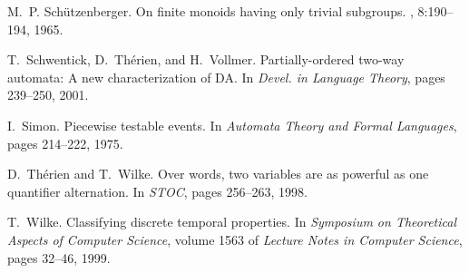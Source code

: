 \documentclass{LMCS}
\begin{document}
\begin{thebibliography}{10}
M.~P. Sch\"utzenberger.
\newblock On finite monoids having only trivial subgroups.
, 8:190--194, 1965.

T.~Schwentick, D.~Th\'erien, and H.~Vollmer.
\newblock Partially-ordered two-way automata: A new characterization of DA.
\newblock In {\em Devel. in Language Theory}, pages 239--250, 2001.

I.~Simon.
\newblock Piecewise testable events.
\newblock In {\em Automata Theory and Formal Languages}, pages 214--222, 1975.

D.~Th\'erien and T.~Wilke.
\newblock Over words, two variables are as powerful as one quantifier
  alternation.
\newblock In {\em STOC}, pages 256--263,
  1998.

T.~Wilke.
\newblock Classifying discrete temporal properties.
\newblock In {\em Symposium on Theoretical Aspects of Computer Science}, volume
  1563 of {\em Lecture Notes in Computer Science}, pages 32--46, 1999.

\end{thebibliography}
\end{document}
